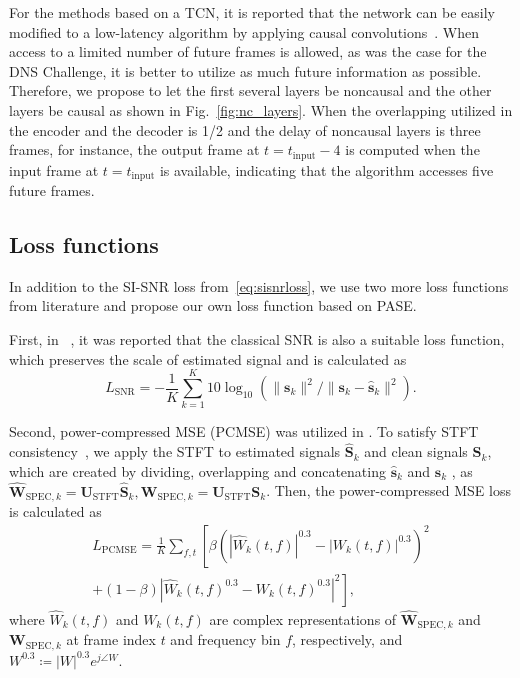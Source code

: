 \documentclass[a4paper]{article}
\begin{document}
\begin{spacing}{0.92}
For the methods based on a TCN, it is reported that 
the network can be easily modified to a low-latency algorithm by 
applying causal convolutions~\cite{bai2018empirical, luo2019conv}.
When access to a limited number of future frames is allowed, as was the case for the DNS Challenge,
it is better to utilize as much future information as possible.
Therefore, we propose to let the first several layers be noncausal and the other layers be causal as shown in Fig.~\ref{fig:nc_layers}.
When the overlapping utilized in the encoder and the decoder is 1/2 and the delay of noncausal layers is three frames, for instance, the output frame at $t = t_{\text{input}}-4$ is computed when the input frame at $t = t_{\text{input}}$ is available, indicating that the algorithm accesses five future frames.

\subsection{Loss functions}
\label{ss:loss}
In addition to the SI-SNR loss from~\eqref{eq:sisnrloss}, 
we use two more loss functions from literature and propose our own loss function based on PASE.

First, in ~\cite{kinoshita2020improving}, it was reported that the classical SNR is also a suitable loss function, which preserves the scale of estimated signal and is calculated as
\begin{equation}
L_{\text{SNR}} = -\frac{1}{K}\sum_{k=1}^K 10\log_{10}(\|\mathbf{s}_k\|^2/\|\mathbf{s}_k-\hat{\mathbf{s}}_k\|^2).
\label{eq:snrloss}
\end{equation}

Second, power-compressed MSE (PCMSE) was utilized in \cite{wisdom2019differentiable,yin2019phasen,erdogan2018investigations}.
To satisfy STFT consistency~\cite{wisdom2019differentiable}, 
we apply the STFT to estimated signals $\hat{\mathbf{S}}_k$
and clean signals $\mathbf{S}_k$, which are created by
dividing, overlapping and concatenating $\hat{\mathbf{s}}_k$ and  $\mathbf{s}_k$ ,
as $\hat{\mathbf{W}}_{\text{SPEC},k} = \mathbf{U}_\text{STFT}\hat{\mathbf{S}}_k, \mathbf{W}_{\text{SPEC},k} = \mathbf{U}_\text{STFT}\mathbf{S}_k$.
Then, the power-compressed MSE loss is calculated as
\begin{equation}
\begin{split}
L_{\text{PCMSE}} = \frac{1}{K}\sum_{f,t}\left[\beta
\left(\left|\hat{W}_k(t,f)\right|^{0.3}-\left|W_k(t,f)\right|^{0.3} \right)^2 \right.\\
\left.+(1-\beta)\left|\hat{W}_k(t,f)^{0.3} - W_k(t,f)^{0.3}\right|^2\right],
\end{split}
\label{eq:compressed_loss}
\end{equation}
where $\hat{W}_k(t,f)$ and $W_k(t,f)$ are complex representations of 
$\hat{\mathbf{W}}_{\text{SPEC},k}$ and $\mathbf{W}_{\text{SPEC},k}$ at frame index $t$ and frequency bin $f$, respectively,
and $W^{0.3}\coloneqq|W|^{0.3}e^{j\angle W}$.


\end{spacing}
\end{document}
